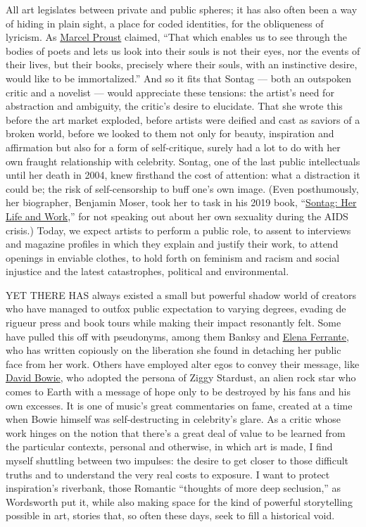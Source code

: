 All art legislates between private and public spheres; it has also often
been a way of hiding in plain sight, a place for coded identities, for
the obliqueness of lyricism. As
\href{https://www.nytimes.com/topic/person/marcel-proust}{Marcel Proust}
claimed, ``That which enables us to see through the bodies of poets and
lets us look into their souls is not their eyes, nor the events of their
lives, but their books, precisely where their souls, with an instinctive
desire, would like to be immortalized.'' And so it fits that Sontag ---
both an outspoken critic and a novelist --- would appreciate these
tensions: the artist's need for abstraction and ambiguity, the critic's
desire to elucidate. That she wrote this before the art market exploded,
before artists were deified and cast as saviors of a broken world,
before we looked to them not only for beauty, inspiration and
affirmation but also for a form of self-critique, surely had a lot to do
with her own fraught relationship with celebrity. Sontag, one of the
last public intellectuals until her death in 2004, knew firsthand the
cost of attention: what a distraction it could be; the risk of
self-censorship to buff one's own image. (Even posthumously, her
biographer, Benjamin Moser, took her to task in his 2019 book,
``\href{https://www.harpercollins.com/9780062896391/sontag/}{Sontag: Her
Life and Work},'' for not speaking out about her own sexuality during
the AIDS crisis.) Today, we expect artists to perform a public role, to
assent to interviews and magazine profiles in which they explain and
justify their work, to attend openings in enviable clothes, to hold
forth on feminism and racism and social injustice and the latest
catastrophes, political and environmental.

YET THERE HAS always existed a small but powerful shadow world of
creators who have managed to outfox public expectation to varying
degrees, evading de rigueur press and book tours while making their
impact resonantly felt. Some have pulled this off with pseudonyms, among
them Banksy and
\href{https://www.nytimes.com/2018/10/31/magazine/elena-ferrante-hbo-my-brilliant-friend.html}{Elena
Ferrante}, who has written copiously on the liberation she found in
detaching her public face from her work. Others have employed alter egos
to convey their message, like
\href{https://www.nytimes.com/topic/person/david-bowie}{David Bowie},
who adopted the persona of Ziggy Stardust, an alien rock star who comes
to Earth with a message of hope only to be destroyed by his fans and his
own excesses. It is one of music's great commentaries on fame, created
at a time when Bowie himself was self-destructing in celebrity's glare.
As a critic whose work hinges on the notion that there's a great deal of
value to be learned from the particular contexts, personal and
otherwise, in which art is made, I find myself shuttling between two
impulses: the desire to get closer to those difficult truths and to
understand the very real costs to exposure. I want to protect
inspiration's riverbank, those Romantic ``thoughts of more deep
seclusion,'' as Wordsworth put it, while also making space for the kind
of powerful storytelling possible in art, stories that, so often these
days, seek to fill a historical void.


